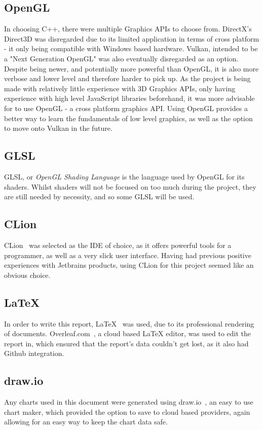 \documentclass[a4paper,10pt]{report}
\begin{document}
\subsection{OpenGL}
In choosing C++, there were multiple Graphics APIs to choose from. DirectX's Direct3D was disregarded due to its limited application in terms of cross platform - it only being compatible with Windows based hardware. Vulkan, intended to be a "Next Generation OpenGL" was also eventually disregarded as an option. Despite being newer, and potentially more powerful than OpenGL, it is also more verbose and lower level and therefore harder to pick up. As the project is being made with relatively little experience with 3D Graphics APIs, only having experience with  high level JavaScript libraries beforehand, it was more advisable for to use OpenGL - a cross platform graphics API. Using OpenGL provides a better way to learn the fundamentals of low level graphics, as well as the option to move onto Vulkan in the future.

\subsection{GLSL}

GLSL, or \textit{OpenGL Shading Language} is the language used by OpenGL for its shaders. Whilst shaders will not be focused on too much during the project, they are still needed by necessity, and so some GLSL will be used.

\subsection{CLion}
CLion~\cite{clion_jetbrains} was selected as the IDE of choice, as it offers powerful tools for a programmer, as well as a very slick user interface. Having had previous positive experiences with Jetbrains products, using CLion for this project seemed like an obvious choice.

\subsection{LaTeX}
In order to write this report, LaTeX~\cite{latex_website} was used, due to its professional rendering of documents. Overleaf.com~\cite{overleaf_website}, a cloud based LaTeX editor, was used to edit the report in, which ensured that the report's data couldn't get lost, as it also had Github integration.

\subsection{draw.io}
Any charts used in this document were generated using draw.io~\cite{draw_io}, an easy to use chart maker, which provided the option to save to cloud based providers, again allowing for an easy way to keep the chart data safe. 
\end{document}

